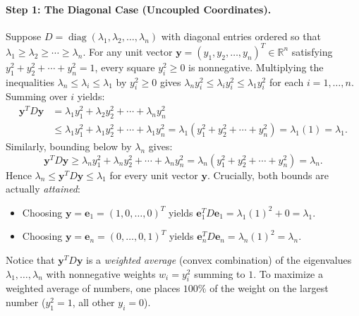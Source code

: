 \documentclass[11pt, letterpaper]{article}
\theoremstyle{definition}
\theoremstyle{remark}
\begin{document}
\paragraph{Step 1: The Diagonal Case (Uncoupled Coordinates).}
Suppose $D = \operatorname{diag}(\lambda_1, \lambda_2, \dots, \lambda_n)$ with diagonal entries ordered so that $\lambda_1 \ge \lambda_2 \ge \cdots \ge \lambda_n$. For any unit vector $\mathbf{y} = (y_1, y_2, \dots, y_n)^T \in \mathbb{R}^n$ satisfying $y_1^2 + y_2^2 + \cdots + y_n^2 = 1$, every square $y_i^2 \ge 0$ is nonnegative. Multiplying the inequalities $\lambda_n \le \lambda_i \le \lambda_1$ by $y_i^2 \ge 0$ gives $\lambda_n y_i^2 \le \lambda_i y_i^2 \le \lambda_1 y_i^2$ for each $i = 1, \dots, n$. Summing over $i$ yields:
\begin{align*}
\mathbf{y}^T D \mathbf{y} &= \lambda_1 y_1^2 + \lambda_2 y_2^2 + \cdots + \lambda_n y_n^2 \\
&\le \lambda_1 y_1^2 + \lambda_1 y_2^2 + \cdots + \lambda_1 y_n^2 = \lambda_1 (y_1^2 + y_2^2 + \cdots + y_n^2) = \lambda_1 (1) = \lambda_1.
\end{align*}
Similarly, bounding below by $\lambda_n$ gives:
\[
\mathbf{y}^T D \mathbf{y} \ge \lambda_n y_1^2 + \lambda_n y_2^2 + \cdots + \lambda_n y_n^2 = \lambda_n (y_1^2 + y_2^2 + \cdots + y_n^2) = \lambda_n.
\]
Hence $\lambda_n \le \mathbf{y}^T D \mathbf{y} \le \lambda_1$ for every unit vector $\mathbf{y}$. Crucially, both bounds are actually \emph{attained}:
\begin{itemize}[leftmargin=2em]
    \item Choosing $\mathbf{y} = \mathbf{e}_1 = (1, 0, \dots, 0)^T$ yields $\mathbf{e}_1^T D \mathbf{e}_1 = \lambda_1(1)^2 + 0 = \lambda_1$.
    \item Choosing $\mathbf{y} = \mathbf{e}_n = (0, \dots, 0, 1)^T$ yields $\mathbf{e}_n^T D \mathbf{e}_n = \lambda_n(1)^2 = \lambda_n$.
\end{itemize}
Notice that $\mathbf{y}^T D \mathbf{y}$ is a \emph{weighted average} (convex combination) of the eigenvalues $\lambda_1, \dots, \lambda_n$ with nonnegative weights $w_i = y_i^2$ summing to $1$. To maximize a weighted average of numbers, one places $100\%$ of the weight on the largest number ($y_1^2 = 1$, all other $y_i = 0$).
\end{document}
